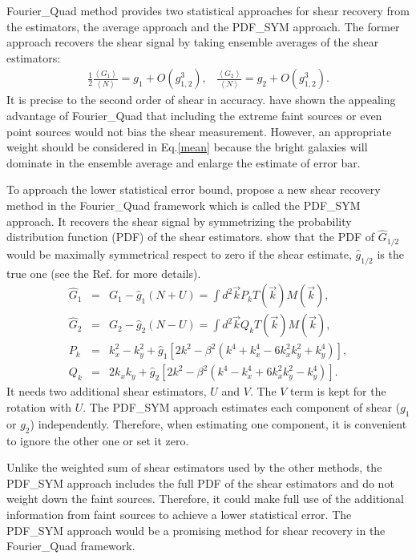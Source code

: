 \documentclass[twocolumn]{aastex62}
\begin{document}
Fourier\_Quad method provides two statistical approaches for shear recovery from the estimators, the average approach and the PDF\_SYM approach. The former approach recovers the shear signal by taking ensemble averages of the shear estimators:
\begin{eqnarray}
\label{mean}
\frac{1}{2}\frac{\left\langle  G_1\right\rangle }{\left\langle  N\right\rangle }=g_1+O(g_{1,2}^3),\;\;\;\frac{\left\langle  G_2\right\rangle }{\left\langle  N\right\rangle }=g_2+O(g_{1,2}^3).
\end{eqnarray}
It is precise to the second order of shear in accuracy\citep{Zhang2015}. \cite{Zhang2015} have shown the appealing advantage of Fourier\_Quad that including the extreme faint sources or even point sources would not bias the shear measurement. However, an appropriate weight should be considered in Eq.\ref{mean} because the bright galaxies will dominate in the ensemble average and enlarge the estimate of error bar.

To approach the lower statistical error bound, \cite{Zhang2017} propose a new shear recovery method in the Fourier\_Quad framework which is called the PDF\_SYM approach. It recovers the shear signal by symmetrizing the probability distribution function (PDF) of the shear estimators. \cite{Zhang2017} show that the PDF of $\hat{G}_{1/2}$ would be maximally symmetrical respect to zero if the shear estimate, $\hat{g}_{1/2}$ is the true one (see the Ref. for more details). 
\begin{eqnarray}
\hat{G}_{1} &=& G_1 - \hat{g}_{1}(N + U) = \int d^2\vec{k} P_k T(\vec{k})M(\vec{k}), \\ \nonumber
\hat{G}_{2} &=& G_2 - \hat{g}_{2}(N - U) = \int d^2\vec{k} Q_k T(\vec{k})M(\vec{k}),\\ \nonumber
P_k &=& k_x^2-k_y^2 + \hat{g}_1\left[2k^2-\beta^2\left(k^4+k_x^4-6k_x^2k_y^2+k_y^4\right)\right],\\ \nonumber
Q_k &=& 2k_xk_y+\hat{g}_2\left[2k^2-\beta^2\left(k^4-k_x^4+6k_x^2k_y^2-k_y^4\right)\right].
\end{eqnarray}
It needs two additional shear estimators, $U$ and $V$. The $V$ term is kept for the rotation with $U$. The PDF\_SYM approach estimates each component of shear ($g_1$ or $g_2$) independently. Therefore, when estimating one component, it is convenient to ignore the other one or set it zero.   

Unlike the weighted sum of shear estimators used by the other methods, the PDF\_SYM approach includes the full PDF of the shear estimators and do not weight down the faint sources. Therefore, it could make full use of the additional information from faint sources to achieve a lower statistical error. The PDF\_SYM approach would be a promising method for shear recovery in the Fourier\_Quad framework.
\end{document}
